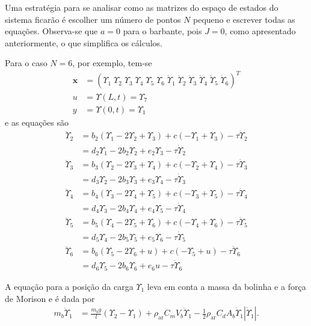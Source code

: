  Uma estratégia para se analisar como as matrizes do espaço de estados do sistema ficarão é escolher um número de pontos $N$ pequeno e escrever todas as equações. Observa-se que $a=0$ para o barbante, pois $J=0$, como apresentado anteriormente, o que simplifica os cálculos.

 Para o caso $N=6$, por exemplo, tem-se \begin{align}
\mathbf{x} &= \left(\Upsilon_1\;\Upsilon_2\;\Upsilon_3\;\Upsilon_4\;\Upsilon_5\;\Upsilon_6\;\dot{\Upsilon}_1\;\dot{\Upsilon}_2\;\dot{\Upsilon}_3\;\dot{\Upsilon}_4\;\dot{\Upsilon}_5\;\dot{\Upsilon}_6\right)^T 	\\
u &= \Upsilon(L,t) = \Upsilon_7\label{ufor6}\\
y &= \Upsilon(0,t) = \Upsilon_1\label{yfor6}
 \end{align} e as equações são \begin{align}
 	\ddot{\Upsilon}_2 &=  b_2\left(\Upsilon_{1}-2\Upsilon_{2} + \Upsilon_{3}\right)+c(-\Upsilon_1 + \Upsilon_3)-\tau \dot{\Upsilon}_2\nonumber \\
 	&= d_2\Upsilon_1 - 2b_2 \Upsilon_2 + e_2\Upsilon_3 - \tau \dot{\Upsilon}_2 \label{upsilon2}\\
 	\ddot{\Upsilon}_3 &=  b_3\left(\Upsilon_{2}-2\Upsilon_{3} + \Upsilon_{4}\right)+c(-\Upsilon_2 + \Upsilon_4)-\tau \dot{\Upsilon}_3\nonumber \\
 	&= d_3\Upsilon_2 - 2b_3 \Upsilon_3 + e_3\Upsilon_4 - \tau \dot{\Upsilon}_3\\
 	\ddot{\Upsilon}_4 &=  b_4\left(\Upsilon_{3}-2\Upsilon_{4} + \Upsilon_{5}\right)+c(-\Upsilon_3 + \Upsilon_5)-\tau \dot{\Upsilon}_4 \nonumber\\
 	&= d_4\Upsilon_3 - 2b_4 \Upsilon_4 + e_4\Upsilon_5 - \tau \dot{\Upsilon}_4\\
 	\ddot{\Upsilon}_5 &=  b_5\left(\Upsilon_{4}-2\Upsilon_{5} + \Upsilon_{6}\right)+c(-\Upsilon_4 + \Upsilon_6)-\tau \dot{\Upsilon}_5\nonumber\\
 	&= d_5\Upsilon_4 - 2b_5 \Upsilon_5 + e_5\Upsilon_6 - \tau \dot{\Upsilon}_5\\
 	\ddot{\Upsilon}_6 &=  b_6\left(\Upsilon_{5}-2\Upsilon_{6} + u\right)+c(-\Upsilon_5 + u)-\tau \dot{\Upsilon}_6\nonumber\\
 	&= d_6\Upsilon_5 - 2b_6 \Upsilon_6 + e_6 u - \tau \dot{\Upsilon}_6 \label{upsilon6}
 \end{align}

 A equação para a posição da carga $\Upsilon_1$ leva em conta a massa da bolinha e a força de Morison e é dada por \begin{align}
 	m_b \ddot{\Upsilon}_1 &= \frac{m_b g}{l}\left(\Upsilon_2 - \Upsilon_1\right) + \rho_{\mathrm{ar}} C_m V_b \ddot{\Upsilon}_1 - \frac{1}{2}\rho_{\textrm{ar}} C_d A_b \dot{\Upsilon}_1 \left|\dot{\Upsilon}_1\right|.\label{upsilon1previa}
 \end{align} 
 
